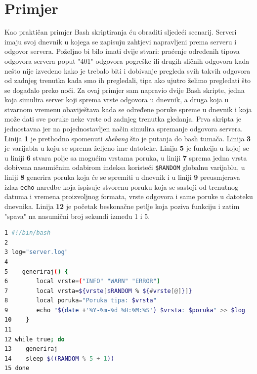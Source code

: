\documentclass{foi}
\begin{document}
\section{Primjer}
Kao praktičan primjer Bash skriptiranja ću obraditi sljedeći scenarij. Serveri imaju svoj dnevnik u kojega se zapisuju zahtjevi napravljeni prema serveru i odgovor servera. Poželjno bi bilo imati dvije stvari: praćenje određenih tipova odgovora servera poput "401" odgovora pogreške ili drugih sličnih odgovora kada nešto nije izvedeno kako je trebalo biti i dobivanje pregleda svih takvih odgovora od zadnjeg trenutka kada smo ih pregledali, tipa ako ujutro želimo pregledati što se događalo preko noći. Za ovaj primjer sam napravio dvije Bash skripte, jedna koja simulira server koji sprema vrste odgovora u dnevnik, a druga koja u stvarnom vremenu obaviještava kada se određene poruke spreme u dnevnik i koja može dati sve poruke neke vrste od zadnjeg trenutka gledanja. Prva skripta je jednostavna jer na pojednostavljen način simulira spremanje odgovora servera. Linija \textbf{1} je prethodno spomenuti \textit{shebang} što je putanja do 
bash tumača. Linija \textbf{3} je varijabla u koju se sprema željeno ime datoteke. Linija \textbf{5} je funkcija u kojoj se u liniji \textbf{6} stvara polje sa mogućim vrstama poruka, u liniji \textbf{7} sprema jedna vrsta dobivena nasumičnim odabirom indeksa koristeći \verb|$RANDOM| globalnu varijablu, u liniji \textbf{8} generira poruka koja će se spremiti u dnevnik i u liniji \textbf{9} preusmjerava izlaz \verb|echo| naredbe koja ispisuje stvorenu poruku koja se sastoji od trenutnog datuma i vremena proizvoljnog formata, vrste odgovora i same poruke u datoteku dnevnika. Linija \textbf{12} je početak beskonačne petlje koja poziva funkciju i zatim "spava" na nasumični broj sekundi između 1 i 5.

\begin{lstlisting}[language=bash]
1 #!/bin/bash
2
3 log="server.log"
4
5    generiraj() {
6        local vrste=("INFO" "WARN" "ERROR")
7        local vrsta=${vrste[$RANDOM % ${#vrste[@]}]}
8        local poruka="Poruka tipa: $vrsta"
9        echo "$(date +'%Y-%m-%d %H:%M:%S') $vrsta: $poruka" >> $log
10    }
11
12 while true; do
13    generiraj
14    sleep $((RANDOM % 5 + 1))
15 done
\end{lstlisting}
\end{document}
